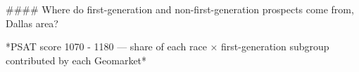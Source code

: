 #### Where do first-generation and non-first-generation prospects come from, Dallas area?

*PSAT score 1070 - 1180 — share of each race × first-generation subgroup contributed by each Geomarket*
